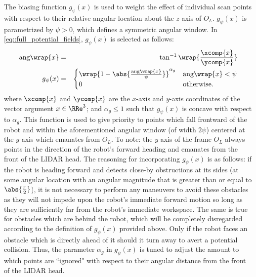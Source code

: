 			The biasing function $g_{\psi}(x)$ is used to weight the effect of individual scan points with respect to their relative angular location about the $z$-axis of $O_{L}$. $g_{\psi}(x)$ is parametrized by $\psi>0$, which defines a symmetric angular window. In \ref{eq::full_potential_fields}, $g_{\psi}(x)$ is selected as follows:
				\begin{eqnarray}
					\text{ang}\wrap{x} &=& \tan^{-1}\wrap{ \frac{\xcomp{x}}{\ycomp{x}} } \nonumber\\
					g_{\psi}(x) &=& 
					\begin{cases}
					\wrap{1-\abs{\frac{\text{ang}\wrap{x}}{\psi}}}^{\alpha_{g}}	& \text{ang}\wrap{x} < \psi \\
					0 	& \text{otherwise}.
					\end{cases}
				\end{eqnarray}
			where $\xcomp{x}$ and $\ycomp{x}$ are the $x$-axis and $y$-axis coordinates of the vector argument $x\in\RRe^{3}$; and $\alpha_{g}\leq1$ such that $g_{\psi}(x)$ is concave with respect to $\alpha_{g}$. This function is used to give priority to points which fall frontward of the robot and within the aforementioned angular window (of width $2\psi$) centered at the $y$-axis which emanates from $O_{L}$. To note: the $y$-axis of the frame $O_{L}$ always points in the direction of the robot's forward heading and emanates from the front of the LIDAR head. The reasoning for incorporating $g_{\psi}(x)$ is as follows: if the robot is heading forward and detects close-by obstructions at its sides (\IE at some angular location with an angular magnitude that is greater than or equal to $\abs{\frac{\pi}{2}}$), it is not necessary to perform any maneuvers to avoid these obstacles as they will not impede upon the robot's immediate forward motion so long as they are sufficiently far from the robot's immediate workspace. The same is true for obstacles which are behind the robot, which will be completely disregarded according to the definition of $g_{\psi}(x)$ provided above. Only if the robot faces an obstacle which is directly ahead of it should it turn away to avert a potential collision. Thus, the parameter $\alpha_{g}$ in $g_{\psi}(x)$ is tuned to adjust the amount to which points are ``ignored" with respect to their angular distance from the front of the LIDAR head.


